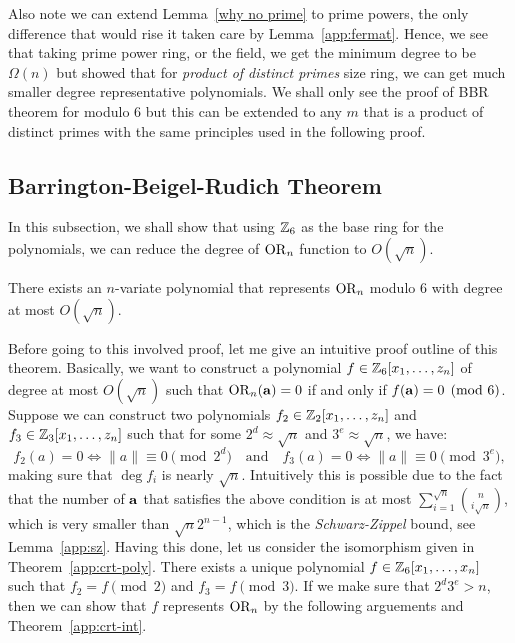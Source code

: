 Also note we can extend Lemma~\ref{why no prime} to prime powers, the only difference that would rise it taken care by Lemma~\ref{app:fermat}. 
Hence, we see that taking prime power ring, or the field, we get the minimum degree to be $\Omega(n)$ but \cite{bbr1992} showed that for \emph{product of distinct primes} size ring, we can get much smaller degree representative polynomials. We shall only see the proof of BBR theorem for modulo $6$ but this can be extended to any $m$ that is a product of distinct primes with the same principles used in the following proof. 

\subsection{Barrington-Beigel-Rudich Theorem}

In this subsection, we shall show that using $\mathbb{Z}_6$ as the base ring for the polynomials, we can reduce the degree of $\operatorname{OR}_n$ function to $O(\sqrt{n})$.

\begin{blackbox}
    \begin{theorem}\label{th:bbr}
        There exists an $n$-variate polynomial that represents $\operatorname{OR}_n$ modulo $6$ with degree at most $O(\sqrt{n})$.
    \end{theorem}
\end{blackbox}
Before going to this involved proof, let me give an intuitive proof outline of this theorem. 
Basically, we want to construct a polynomial $f\in\mathbb{Z}_6[x_1,\ldots,z_n]$ of degree at most $O(\sqrt{n})$ such that $\operatorname{OR}_n(\mathbf{a}) = 0$ if and only if $f(\mathbf{a}) = 0\pmod6$.
Suppose we can construct two polynomials $f_2\in\mathbb{Z}_2[x_1,\ldots,z_n]$ and $f_3\in\mathbb{Z}_3[x_1,\ldots,z_n]$ such that for some $2^d\approx\sqrt{n}$ and $3^e\approx\sqrt{n}$, we have:
\[
f_2(a) = 0 \iff \|a\| \equiv 0 \pmod{2^d} \quad \text{and} \quad f_3(a) = 0 \iff \|a\| \equiv 0 \pmod{3^e},
\]
making sure that $\deg f_i$ is nearly $\sqrt{n}$. Intuitively this is possible due to the fact that the number of $\mathbf{a}$ that satisfies the above condition is at most $\sum_{i = 1}^{\sqrt{n}}\binom{n}{i\sqrt{n}}$, which is very smaller than $\sqrt{n}2^{n-1}$, which is the \emph{Schwarz-Zippel} bound, see Lemma~\ref{app:sz}. Having this done, let us consider the isomorphism given in Theorem~\ref{app:crt-poly}. There exists a unique polynomial $f\in\mathbb{Z}_6[x_1,\ldots,x_n]$ such that $f_2 = f\pmod2$ and $f_3 = f\pmod3$.
If we make sure that $2^d3^e>n$, then we can show that $f$ represents $\operatorname{OR}_n$ by the following arguements and Theorem~\ref{app:crt-int}.

